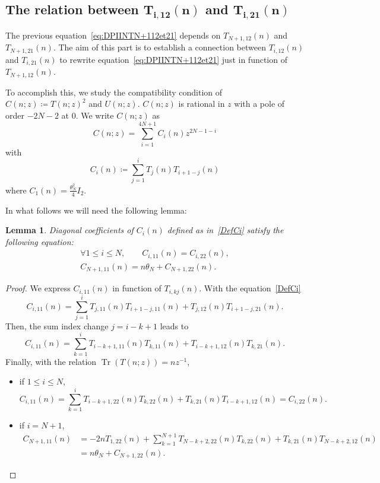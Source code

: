 \documentclass[pdftex]{sigma}%
\numberwithin{equation}{section}
\newtheorem{Lemma}[Theorem]{Lemma}
\DeclareMathOperator{\Tr}{Tr}
\begin{document}
\subsection[The relation between T\_\{i,12\}(n) and T\_\{i,21\}(n)]{The relation between $\boldsymbol{T_{i,12}(n)}$ and $\boldsymbol{T_{i,21}(n)}$}

	The previous equation~\eqref{eq:DPIINTN+112et21} depends on $T_{N+1,12}(n)$ and $T_{N+1,21}(n)$. The aim of this part is to establish a connection between $T_{i,12}(n)$ and $T_{i,21}(n)$ to rewrite equation~\eqref{eq:DPIINTN+112et21} just in function of~$T_{N+1,12}(n)$.

To accomplish this, we study the compatibility condition of $C(n;z)\coloneqq T(n;z)^2$ and $U(n;z)$.
$C(n;z)$ is rational in $z$ with a pole of order $-2N-2$ at $0$. We write $C(n;z)$ as
	\begin{equation}
		C(n;z)=\sum_{i=1}^{4N+1}C_i(n)z^{2N-1-i}
		\label{exprC}
	\end{equation}
	with{\samepage
	\begin{equation}
		C_i(n)\coloneqq\sum_{j=1}^iT_j(n)T_{i+1-j}(n)
		\label{DefCi}
	\end{equation}
	where $C_1(n)=\frac{\theta_N^2}{4}I_2$.}
	
	In what follows we will need the following lemma:
	\begin{Lemma}
		\label{lemma:CiCN+1}
		Diagonal coefficients of $C_i(n)$ defined as in~\eqref{DefCi} satisfy the following equation:
\begin{gather*}
\forall 1\leqslant i\leqslant N,\qquad C_{i,11}(n)=C_{i,22}(n),
\\
C_{N+1,11}(n)=n\theta_N+C_{N+1,22}(n).
\end{gather*}
	\end{Lemma}

	\begin{proof}
		We express $C_{i,11}(n)$ in function of $T_{i,kj}(n)$. With the equation~\eqref{DefCi}
\begin{equation*}
C_{i,11}(n)=\sum_{j=1}^iT_{j,11}(n)T_{i+1-j,11}(n)+T_{j,12}(n)T_{i+1-j,21}(n).
\end{equation*}
Then, the sum index change $j=i-k+1$ leads to
\begin{equation*}
C_{i,11}(n)=\sum_{k=1}^iT_{i-k+1,11}(n)T_{k,11}(n)+T_{i-k+1,12}(n)T_{k,21}(n).
\end{equation*}
		Finally, with the relation $\Tr(T(n;z))=nz^{-1}$,
\begin{itemize}\itemsep=0pt
		\item if $1\leqslant i\leqslant N$,
\begin{equation*}
C_{i,11}(n)=\sum_{k=1}^iT_{i-k+1,22}(n)T_{k,22}(n)+T_{k,21}(n)T_{i-k+1,12}(n)=C_{i,22}(n).
\end{equation*}
		\item if $i=N+1$,
\begin{align*}
C_{N+1,11}(n)&=-2nT_{1,22}(n)+\sum_{k=1}^{N+1}T_{N-k+2,22}(n)T_{k,22}(n)+T_{k,21}(n)T_{N-k+2,12}(n)
\\
&=n\theta_N+C_{N+1,22}(n).
 \tag*{\qed}
\end{align*}
\end{itemize}\renewcommand{\qed}{}
\end{proof}
	
\end{document}

